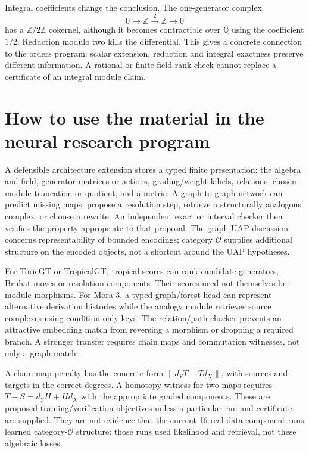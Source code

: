Integral coefficients change the conclusion. The one-generator complex
\[
 0\longrightarrow\mathbb Z\xrightarrow{\;2\;}\mathbb Z\longrightarrow0
\]
has a $\mathbb Z/2\mathbb Z$ cokernel, although it becomes contractible over $\mathbb Q$ using the coefficient $1/2$. Reduction modulo two kills the differential. This gives a concrete connection to the orders program: scalar extension, reduction and integral exactness preserve different information. A rational or finite-field rank check cannot replace a certificate of an integral module claim.

\section{How to use the material in the neural research program}
\label{sec:wb-bgg-neural}

A defensible architecture extension stores a typed finite presentation: the algebra and field, generator matrices or actions, grading/weight labels, relations, chosen module truncation or quotient, and a metric. A graph-to-graph network can predict missing maps, propose a resolution step, retrieve a structurally analogous complex, or choose a rewrite. An independent exact or interval checker then verifies the property appropriate to that proposal. The graph-UAP discussion concerns representability of bounded encodings; category $\mathcal O$ supplies additional structure on the encoded objects, not a shortcut around the UAP hypotheses.

For ToricGT or TropicalGT, tropical scores can rank candidate generators, Bruhat moves or resolution components. Their scores need not themselves be module morphisms. For Mora-3, a typed graph/forest head can represent alternative derivation histories while the analogy module retrieves source complexes using condition-only keys. The relation/path checker prevents an attractive embedding match from reversing a morphism or dropping a required branch. A stronger transfer requires chain maps and commutation witnesses, not only a graph match.

A chain-map penalty has the concrete form $\|d_YT-Td_X\|$, with sources and targets in the correct degrees. A homotopy witness for two maps requires $T-S=d_YH+Hd_X$ with the appropriate graded components. These are proposed training/verification objectives unless a particular run and certificate are supplied. They are not evidence that the current 16 real-data component runs learned category-$\mathcal O$ structure: those runs used likelihood and retrieval, not these algebraic losses.

